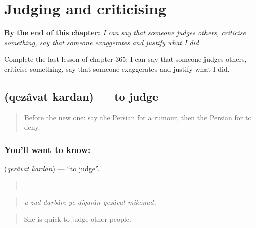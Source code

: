 
\chapter{Judging and criticising}
\label{ch:fa-judging-and-criticising}

\begin{chapteropening}
\textbf{By the end of this chapter:} \emph{I can say that someone judges others, criticise something, say that someone exaggerates and justify what I did.}

Complete the last lesson of chapter 365: I can say that someone judges others, criticise something, say that someone exaggerates and justify what I did.
\end{chapteropening}

\section[\texorpdfstring{\fa{قضاوت} \fa{کردن} (qezâvat kardan)}{قضاوت کردن (qezâvat kardan)}]{  (qezâvat kardan) — to judge}

\label{lesson:FA-C365-qezavat-kardan}



\begin{quote}
Before the new one: say the Persian for a rumour, then the Persian for to deny.
\end{quote}

\subsection*{You'll want to know:  }
\textbf{ } (\emph{qezâvat kardan}) — \textquotedblleft{}to judge\textquotedblright{}.

\begin{quote}
     .
\end{quote}

\begin{quote}
\emph{u zud darbâre-ye digarân qezâvat mikonad.}
\end{quote}

\begin{quote}
She is quick to judge other people.
\end{quote}

